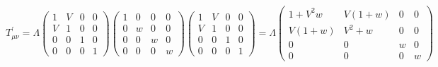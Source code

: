\begin{equation}
T^{'}_{\mu\nu} =
\Lambda
\left( 
\begin{array}{cccc}
1 & V & 0 & 0 \\
V & 1 & 0 & 0 \\
0 & 0 & 1 & 0 \\
0 & 0 & 0 & 1 
\end{array}
\right)
\left( 
\begin{array}{cccc}
1 & 0 & 0 & 0 \\
0 & w & 0 & 0 \\
0 & 0 & w & 0 \\
0 & 0 & 0 & w 
\end{array}
\right)
\left( 
\begin{array}{cccc}
1 & V & 0 & 0 \\
V & 1 & 0 & 0 \\
0 & 0 & 1 & 0 \\
0 & 0 & 0 & 1 
\end{array}
\right)
=
\Lambda
\left( 
\begin{array}{cccc}
1+V^2w & V(1+w) & 0 & 0 \\
V(1+w) & V^2+w & 0 & 0 \\
0 & 0 & w & 0 \\
0 & 0 & 0 & w 
\end{array}
\right)
\label{boost}
\end{equation}

